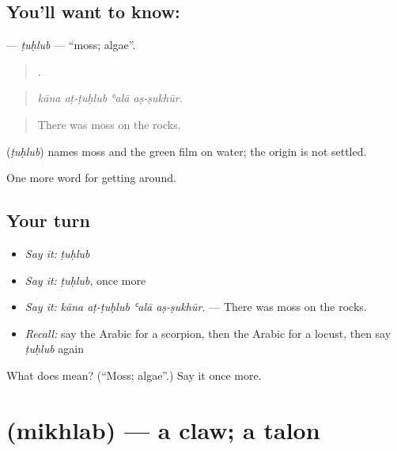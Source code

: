 \subsection*{You'll want to know: }
\textbf{} — \emph{ṭuḥlub} — \textquotedblleft{}moss; algae\textquotedblright{}.

\begin{quote}
   .
\end{quote}

\begin{quote}
\emph{kāna aṭ-ṭuḥlub ʿalā aṣ-ṣukhūr.}
\end{quote}

\begin{quote}
There was moss on the rocks.
\end{quote}

\begin{cousinweb}
\textbf{} (\emph{ṭuḥlub}) names moss and the green film on water; the origin is not settled.
\end{cousinweb}

\begin{grammarlens}[title={What you've built}]
One more word for getting around.
\end{grammarlens}

\subsection*{Your turn}
\begin{itemize}
\raggedright
  \item \emph{Say it:} \emph{ṭuḥlub}
  \item \emph{Say it:} \emph{ṭuḥlub}, once more
  \item \emph{Say it:} \emph{kāna aṭ-ṭuḥlub ʿalā aṣ-ṣukhūr.} — There was moss on the rocks.
  \item \emph{Recall:} say the Arabic for a scorpion, then the Arabic for a locust, then say \emph{ṭuḥlub} again
\end{itemize}

\begin{tcolorbox}[breakable,colback=teal!4,colframe=teal!35!black,title={Before you move on}]
What does  mean? (\textquotedblleft{}Moss; algae\textquotedblright{}.) Say it once more.
\end{tcolorbox}
\section[\texorpdfstring{\ar{مخلب} (mikhlab)}{مخلب (mikhlab)}]{ (mikhlab) — a claw; a talon}

